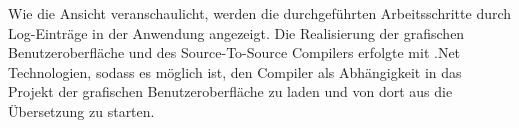 Wie die Ansicht veranschaulicht, werden die durchgeführten Arbeitsschritte durch Log-Einträge in der Anwendung angezeigt.
Die Realisierung der grafischen Benutzeroberfläche 
und des Source-To-Source Compilers erfolgte mit  .Net Technologien,  sodass es möglich ist,  den Compiler als Abhängigkeit in das Projekt der grafischen Benutzeroberfläche zu laden und von dort aus die Übersetzung zu starten.  